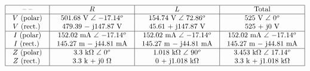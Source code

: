 






$$\vbox{\offinterlineskip
\halign{\strut
\vrule \quad\hfil # \ \hfil & 
\vrule \quad\hfil # \ \hfil & 
\vrule \quad\hfil # \ \hfil & 
\vrule \quad\hfil # \ \hfil \vrule \cr
\noalign{\hrule}
%
 -- -- & $R$ & $L$ & Total \cr
%
\noalign{\hrule}
%
$V$ (polar) & 501.68 V $\angle$ $-17.14^o$ & 154.74 V $\angle$ $72.86^o$ & 525 V $\angle$ $0^{o}$ \cr
$V$ (rect.) & 479.39 $-$ j147.87 V & 45.61 + j147.87 V & 525 + j0 V \cr
%
\noalign{\hrule}
%
$I$ (polar) & 152.02 mA $\angle$ $-17.14^o$ & 152.02 mA $\angle$ $-17.14^o$ & 152.02 mA $\angle$ $-17.14^o$ \cr
$I$ (rect.) & 145.27 m $-$ j44.81 mA & 145.27 m $-$ j44.81 mA & 145.27 m $-$ j44.81 mA \cr
%
\noalign{\hrule}
%
$Z$ (polar) & 3.3 k$\Omega$ $\angle$ $0^o$ & 1.018 k$\Omega$ $\angle$ $90^o$ & 3.453 k$\Omega$ $\angle$ $17.14^{o}$ \cr
$Z$ (rect.) & 3.3 k + j0 $\Omega$ & 0 + j1.018 k$\Omega$ & 3.3 k + j1.018 k$\Omega$ \cr
%
\noalign{\hrule}
} %
}$$ %




